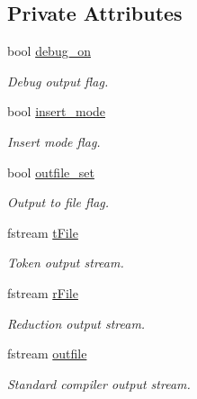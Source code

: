 \subsection*{Private Attributes}
\begin{DoxyCompactItemize}
\item 
\hypertarget{classCCompiler_a3d8342e750d676effe2ee92161129360}{bool \hyperlink{classCCompiler_a3d8342e750d676effe2ee92161129360}{debug\-\_\-on}}\label{classCCompiler_a3d8342e750d676effe2ee92161129360}

\begin{DoxyCompactList}\small\item\em Debug output flag. \end{DoxyCompactList}\item 
\hypertarget{classCCompiler_a26d9cf998c4bb1fd8a1f115ee5a23123}{bool \hyperlink{classCCompiler_a26d9cf998c4bb1fd8a1f115ee5a23123}{insert\-\_\-mode}}\label{classCCompiler_a26d9cf998c4bb1fd8a1f115ee5a23123}

\begin{DoxyCompactList}\small\item\em Insert mode flag. \end{DoxyCompactList}\item 
\hypertarget{classCCompiler_a769915c7fae8eb76d704c0735c90dffa}{bool \hyperlink{classCCompiler_a769915c7fae8eb76d704c0735c90dffa}{outfile\-\_\-set}}\label{classCCompiler_a769915c7fae8eb76d704c0735c90dffa}

\begin{DoxyCompactList}\small\item\em Output to file flag. \end{DoxyCompactList}\item 
\hypertarget{classCCompiler_a9b1dffb0bbfbe87f667dae2fbb4bf12b}{fstream \hyperlink{classCCompiler_a9b1dffb0bbfbe87f667dae2fbb4bf12b}{t\-File}}\label{classCCompiler_a9b1dffb0bbfbe87f667dae2fbb4bf12b}

\begin{DoxyCompactList}\small\item\em Token output stream. \end{DoxyCompactList}\item 
\hypertarget{classCCompiler_a1d71bda765bab9dff0b56660237125ac}{fstream \hyperlink{classCCompiler_a1d71bda765bab9dff0b56660237125ac}{r\-File}}\label{classCCompiler_a1d71bda765bab9dff0b56660237125ac}

\begin{DoxyCompactList}\small\item\em Reduction output stream. \end{DoxyCompactList}\item 
\hypertarget{classCCompiler_ab2b012bff98533fc4eaeb36c36a3dea9}{fstream \hyperlink{classCCompiler_ab2b012bff98533fc4eaeb36c36a3dea9}{outfile}}\label{classCCompiler_ab2b012bff98533fc4eaeb36c36a3dea9}

\begin{DoxyCompactList}\small\item\em Standard compiler output stream. \end{DoxyCompactList}\end{DoxyCompactItemize}


